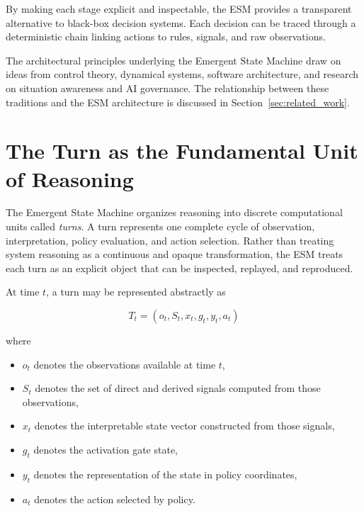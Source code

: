 \documentclass[11pt]{article}
\begin{document}
By making each stage explicit and inspectable, the ESM provides a transparent alternative to black-box decision systems. Each decision can be traced through a deterministic chain linking actions to rules, signals, and raw observations.

The architectural principles underlying the Emergent State Machine draw on ideas from control theory, dynamical systems, software architecture, and research on situation awareness and AI governance. The relationship between these traditions and the ESM architecture is discussed in Section~\ref{sec:related_work}.



\section{The Turn as the Fundamental Unit of Reasoning}

The Emergent State Machine organizes reasoning into discrete computational units called \emph{turns}. A turn represents one complete cycle of observation, interpretation, policy evaluation, and action selection. Rather than treating system reasoning as a continuous and opaque transformation, the ESM treats each turn as an explicit object that can be inspected, replayed, and reproduced.

At time $t$, a turn may be represented abstractly as

\begin{equation}
T_t = (o_t, S_t, x_t, g_t, y_t, a_t)
\end{equation}

where

\begin{itemize}
\item $o_t$ denotes the observations available at time $t$,
\item $S_t$ denotes the set of direct and derived signals computed from those observations,
\item $x_t$ denotes the interpretable state vector constructed from those signals,
\item $g_t$ denotes the activation gate state,
\item $y_t$ denotes the representation of the state in policy coordinates,
\item $a_t$ denotes the action selected by policy.
\end{itemize}
\end{document}
